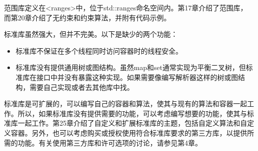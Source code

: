 
范围库定义在<ranges>中，位于std::ranges命名空间内。第17章介绍了范围库，而第20章介绍了无约束和约束算法，并附有代码示例。


标准库虽然强大，但并不完美。以下是缺少的两个功能：

\begin{itemize}
\item
标准库不保证在多个线程同时访问容器时的线程安全。

\item
标准库没有提供通用树或图结构。虽然map和set通常实现为平衡二叉树，但标准库在接口中并没有暴露这种实现。如果需要像编写解析器这样的树或图结构，需要自己实现或者去其他库中找。
\end{itemize}

标准库是可扩展的，可以编写自己的容器和算法，使其与现有的算法和容器一起工作。所以，如果标准库没有提供需要的功能，可以考虑编写想要的功能，使其与标准库一起工作。第25章介绍了自定义和扩展标准库的主题，包括自定义算法和自定义容器。另外，也可以考虑购买或授权使用符合标准库要求的第三方库，以提供所需的功能。有关使用第三方库和许可选项的讨论，请参见第4章。






